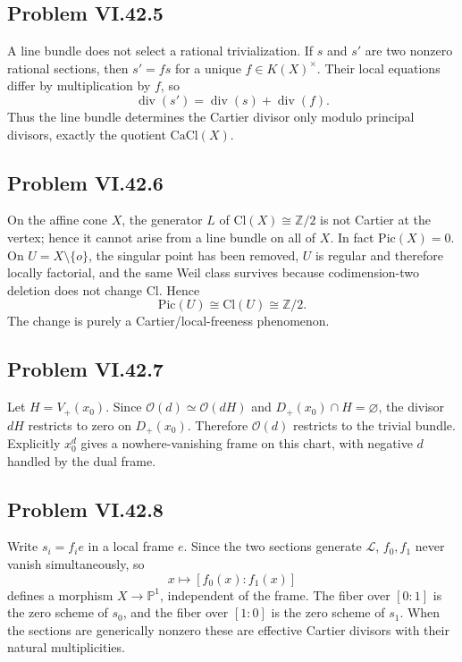 \subsection*{Problem VI.42.5}
\begin{solution}
A line bundle does not select a rational trivialization.  If \(s\) and \(s'\) are two nonzero rational sections, then \(s'=fs\) for a unique \(f\in K(X)^\times\).  Their local equations differ by multiplication by \(f\), so
\[
\operatorname{div}(s')=\operatorname{div}(s)+\operatorname{div}(f).
\]
Thus the line bundle determines the Cartier divisor only modulo principal divisors, exactly the quotient \(\mathrm{CaCl}(X)\).
\end{solution}

\subsection*{Problem VI.42.6}
\begin{solution}
On the affine cone \(X\), the generator \(L\) of \(\mathrm{Cl}(X)\cong\mathbb Z/2\) is not Cartier at the vertex; hence it cannot arise from a line bundle on all of \(X\).  In fact \(\mathrm{Pic}(X)=0\).  On \(U=X\setminus\{o\}\), the singular point has been removed, \(U\) is regular and therefore locally factorial, and the same Weil class survives because codimension-two deletion does not change \(\mathrm{Cl}\).  Hence
\[
\mathrm{Pic}(U)\cong\mathrm{Cl}(U)\cong\mathbb Z/2.
\]
The change is purely a Cartier/local-freeness phenomenon.
\end{solution}

\subsection*{Problem VI.42.7}
\begin{solution}
Let \(H=V_+(x_0)\).  Since \(\mathcal O(d)\simeq\mathcal O(dH)\) and \(D_+(x_0)\cap H=\varnothing\), the divisor \(dH\) restricts to zero on \(D_+(x_0)\).  Therefore \(\mathcal O(d)\) restricts to the trivial bundle.  Explicitly \(x_0^d\) gives a nowhere-vanishing frame on this chart, with negative \(d\) handled by the dual frame.
\end{solution}

\subsection*{Problem VI.42.8}
\begin{solution}
Write \(s_i=f_i e\) in a local frame \(e\).  Since the two sections generate \(\mathcal L\), \(f_0,f_1\) never vanish simultaneously, so
\[
x\mapsto[f_0(x):f_1(x)]
\]
defines a morphism \(X\to\mathbb P^1\), independent of the frame.  The fiber over \([0:1]\) is the zero scheme of \(s_0\), and the fiber over \([1:0]\) is the zero scheme of \(s_1\).  When the sections are generically nonzero these are effective Cartier divisors with their natural multiplicities.
\end{solution}

